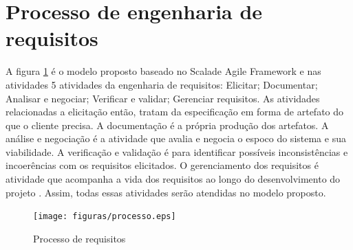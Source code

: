 \section[Processo de engenharia de requisitos]{Processo de engenharia de requisitos}

A figura \ref{processo} é o modelo proposto baseado no Scalade Agile Framework e nas atividades 5 atividades da engenharia de requisitos: Elicitar; Documentar; Analisar e negociar; Verificar e validar; Gerenciar requisitos. As atividades relacionadas a elicitação então, tratam da especificação em forma de artefato do que o cliente precisa. A documentação é a própria produção dos artefatos. A análise e negociação é a atividade que avalia e negocia o espoco do sistema e sua viabilidade. A verificação e validação é para identificar possíveis inconsistências e incoerências com os requisitos elicitados. O gerenciamento dos requisitos é atividade que acompanha a vida dos requisitos ao longo do desenvolvimento do projeto \cite{thayer1997}. Assim, todas essas atividades serão atendidas no modelo proposto.

\begin{figure}[H]
    \centering
    \caption{Processo de requisitos}
    \label{processo}
    \texttt{[image: figuras/processo.eps]}
\end{figure}

